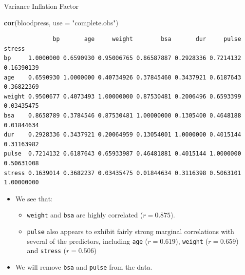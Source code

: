 \documentclass[
  ignorenonframetext,
]{beamer}
\newenvironment{Shaded}{\begin{snugshade}}{\end{snugshade}}
\newcommand{\AttributeTok}[1]{\textcolor[rgb]{0.13,0.29,0.53}{#1}}
\newcommand{\FunctionTok}[1]{\textcolor[rgb]{0.13,0.29,0.53}{\textbf{#1}}}
\newcommand{\NormalTok}[1]{#1}
\newcommand{\StringTok}[1]{\textcolor[rgb]{0.31,0.60,0.02}{#1}}
\providecommand{\tightlist}{%
  \setlength{\itemsep}{0pt}\setlength{\parskip}{0pt}}
\begin{document}
\begin{frame}[fragile]{Variance Inflation Factor}
\label{variance-inflation-factor-3}
\tiny

\begin{Shaded}
\begin{Highlighting}[]
\FunctionTok{cor}\NormalTok{(bloodpress, }\AttributeTok{use =} \StringTok{"complete.obs"}\NormalTok{)}
\end{Highlighting}
\end{Shaded}

\begin{verbatim}
              bp       age     weight        bsa       dur     pulse     stress
bp     1.0000000 0.6590930 0.95006765 0.86587887 0.2928336 0.7214132 0.16390139
age    0.6590930 1.0000000 0.40734926 0.37845460 0.3437921 0.6187643 0.36822369
weight 0.9500677 0.4073493 1.00000000 0.87530481 0.2006496 0.6593399 0.03435475
bsa    0.8658789 0.3784546 0.87530481 1.00000000 0.1305400 0.4648188 0.01844634
dur    0.2928336 0.3437921 0.20064959 0.13054001 1.0000000 0.4015144 0.31163982
pulse  0.7214132 0.6187643 0.65933987 0.46481881 0.4015144 1.0000000 0.50631008
stress 0.1639014 0.3682237 0.03435475 0.01844634 0.3116398 0.5063101 1.00000000
\end{verbatim}

\normalsize

\begin{itemize}
\item
  We see that:

  \begin{itemize}
  \tightlist
  \item
    \texttt{weight} and \texttt{bsa} are highly correlated
    (\(r= 0.875\)).
  \item
    \texttt{pulse} also appears to exhibit fairly strong marginal
    correlations with several of the predictors, including \texttt{age}
    (\(r = 0.619\)), \texttt{weight} (\(r = 0.659\)) and \texttt{stress}
    (\(r = 0.506\))
  \end{itemize}
\item
  We will remove \texttt{bsa} and \texttt{pulse} from the data.
\end{itemize}
\end{frame}
\end{document}
